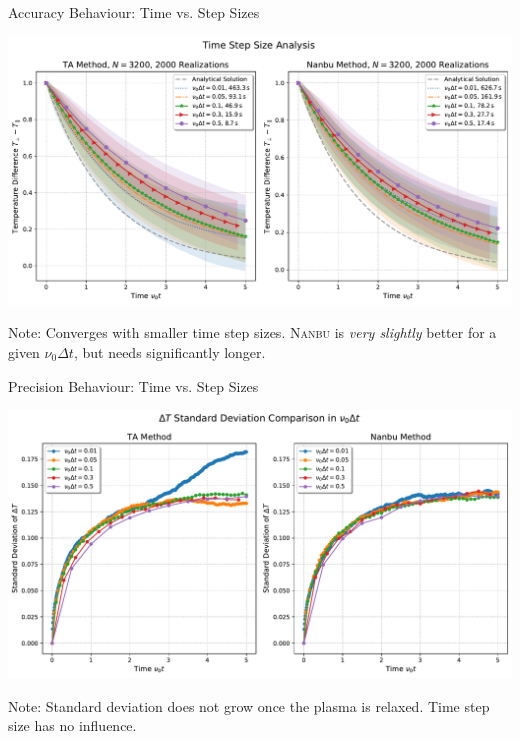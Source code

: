 \begin{frame}{Accuracy Behaviour: Time vs. Step Sizes}
    \begin{minipage}{\textwidth}
        \centering
        \includegraphics[width=\textwidth]{ressources/test1/temperature_diff_dT_combined_shaded.pdf}
    \end{minipage}
    Note: Converges with smaller time step sizes. \textsc{Nanbu} is \textit{very slightly} better for a given $\nu_0\Delta t$, but needs significantly longer.
\end{frame}

\begin{frame}{Precision Behaviour: Time vs. Step Sizes}
    \begin{minipage}{\textwidth}
        \centering
        \includegraphics[width=\textwidth]{ressources/test1/temperature_std_dt_comparison.pdf}
    \end{minipage}
    Note: Standard deviation does not grow once the plasma is relaxed. Time step size has no influence. 
\end{frame}

